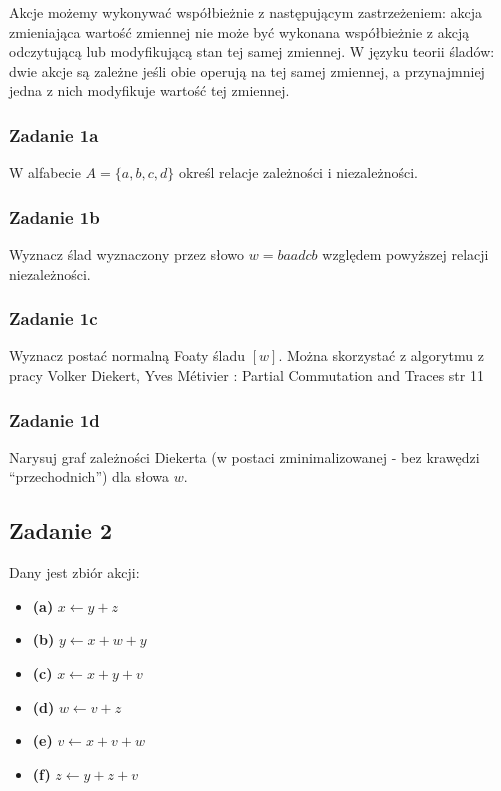 \documentclass[11pt]{article}
\providecommand{\tightlist}{%
      \setlength{\itemsep}{0pt}\setlength{\parskip}{0pt}}
\begin{document}
Akcje możemy wykonywać współbieżnie z następującym zastrzeżeniem: akcja
zmieniająca wartość zmiennej nie może być wykonana współbieżnie z akcją
odczytującą lub modyfikującą stan tej samej zmiennej. W języku teorii
śladów: dwie akcje są zależne jeśli obie operują na tej samej zmiennej,
a przynajmniej jedna z nich modyfikuje wartość tej zmiennej.

\hypertarget{zadanie-1a}{%
\subsubsection{Zadanie 1a}\label{zadanie-1a}}

W alfabecie \(A = \{a, b, c, d\}\) określ relacje zależności i
niezależności.

\hypertarget{zadanie-1b}{%
\subsubsection{Zadanie 1b}\label{zadanie-1b}}

Wyznacz ślad wyznaczony przez słowo \(w = baadcb\) względem powyższej
relacji niezależności.

\hypertarget{zadanie-1c}{%
\subsubsection{Zadanie 1c}\label{zadanie-1c}}

Wyznacz postać normalną Foaty śladu \([w]\). Można skorzystać z
algorytmu z pracy Volker Diekert, Yves Métivier : Partial Commutation
and Traces str 11

\hypertarget{zadanie-1d}{%
\subsubsection{Zadanie 1d}\label{zadanie-1d}}

Narysuj graf zależności Diekerta (w postaci zminimalizowanej - bez
krawędzi ``przechodnich'') dla słowa \(w\).

    \hypertarget{zadanie-2}{%
\subsection{Zadanie 2}\label{zadanie-2}}

Dany jest zbiór akcji:

\begin{itemize}
\tightlist
\item
  \textbf{(a)} \(x ← y + z\)
\item
  \textbf{(b)} \(y ← x + w + y\)
\item
  \textbf{(c)} \(x ← x + y + v\)
\item
  \textbf{(d)} \(w ← v + z\)
\item
  \textbf{(e)} \(v ← x + v + w\)
\item
  \textbf{(f)} \(z ← y + z + v\)
\end{itemize}
\end{document}
